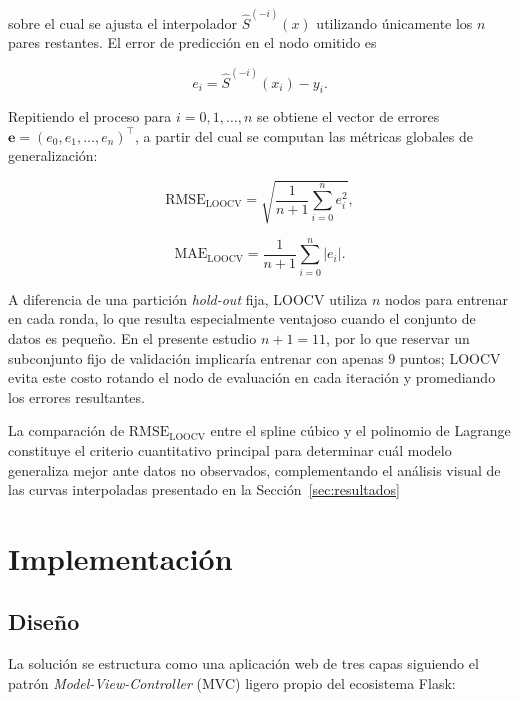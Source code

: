\documentclass[conference]{IEEEtran}
\begin{document}
\noindent sobre el cual se ajusta el interpolador $\hat{S}^{(-i)}(x)$
utilizando únicamente los $n$ pares restantes. El error de predicción
en el nodo omitido es

\begin{equation}
e_i = \hat{S}^{(-i)}(x_i) - y_i.
\label{eq:loocv_error}
\end{equation}

Repitiendo el proceso para $i = 0, 1, \ldots, n$ se obtiene el
vector de errores $\mathbf{e} = (e_0, e_1, \ldots, e_n)^\top$,
a partir del cual se computan las métricas globales de generalización:

\begin{equation}
\mathrm{RMSE}_{\mathrm{LOOCV}} =
    \sqrt{\frac{1}{n+1}\sum_{i=0}^{n} e_i^2},
\label{eq:loocv_rmse}
\end{equation}

\begin{equation}
\mathrm{MAE}_{\mathrm{LOOCV}} =
    \frac{1}{n+1}\sum_{i=0}^{n} |e_i|.
\label{eq:loocv_mae}
\end{equation}

A diferencia de una partición \textit{hold-out} fija, LOOCV utiliza
$n$ nodos para entrenar en cada ronda, lo que resulta especialmente
ventajoso cuando el conjunto de datos es pequeño. En el presente
estudio $n+1 = 11$, por lo que reservar un subconjunto fijo de
validación implicaría entrenar con apenas 9 puntos; LOOCV evita
este costo rotando el nodo de evaluación en cada iteración y
promediando los errores resultantes.

La comparación de $\mathrm{RMSE}_{\mathrm{LOOCV}}$ entre el spline
cúbico y el polinomio de Lagrange constituye el criterio cuantitativo
principal para determinar cuál modelo generaliza mejor ante datos
no observados, complementando el análisis visual de las curvas
interpoladas presentado en la Sección~\ref{sec:resultados}

\section{Implementación}

\subsection{Diseño}

La solución se estructura como una aplicación web de tres capas siguiendo el patrón \textit{Model-View-Controller} (MVC) ligero propio del ecosistema
Flask:
\end{document}
